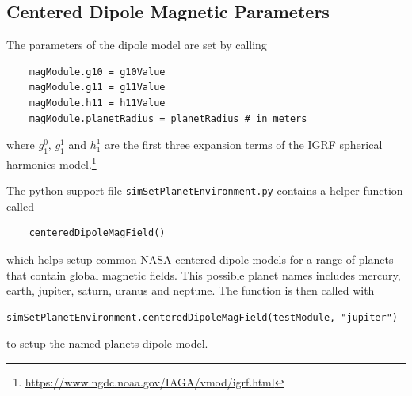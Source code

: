 \subsection{Centered Dipole Magnetic Parameters}
The parameters of the dipole model are set by calling
\begin{verbatim}
    magModule.g10 = g10Value
    magModule.g11 = g11Value
    magModule.h11 = h11Value
    magModule.planetRadius = planetRadius # in meters
\end{verbatim}
where $g_{1}^{0}$, $g_{1}^{1}$ and $h_{1}^{1}$ are the first three expansion terms of the IGRF spherical harmonics model.\footnote{\url{https://www.ngdc.noaa.gov/IAGA/vmod/igrf.html}}

The python support file {\tt simSetPlanetEnvironment.py} contains a helper function called
\begin{verbatim}
	centeredDipoleMagField()
\end{verbatim}
which helps setup common NASA centered dipole models for a range of planets that contain global magnetic fields.  This possible planet names includes mercury, earth, jupiter, saturn, uranus and neptune.  The function is then called with
\begin{verbatim}
simSetPlanetEnvironment.centeredDipoleMagField(testModule, "jupiter")
\end{verbatim}
to setup the named planets dipole model.
